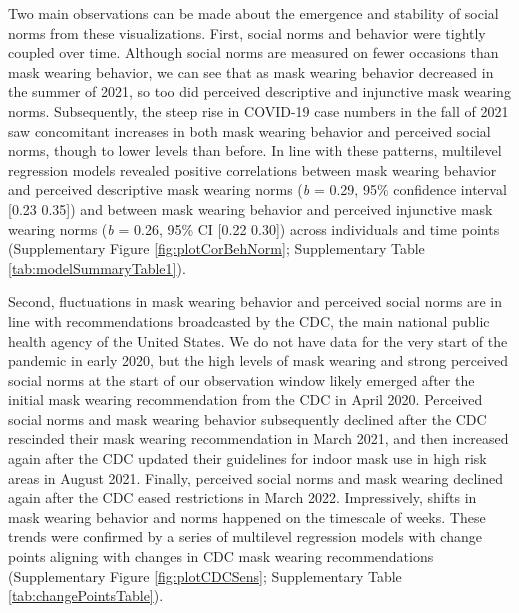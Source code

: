 \documentclass[
  man,floatsintext]{apa6}
\begin{document}
Two main observations can be made about the emergence and stability of social norms from these visualizations. First, social norms and behavior were tightly coupled over time. Although social norms are measured on fewer occasions than mask wearing behavior, we can see that as mask wearing behavior decreased in the summer of 2021, so too did perceived descriptive and injunctive mask wearing norms. Subsequently, the steep rise in COVID-19 case numbers in the fall of 2021 saw concomitant increases in both mask wearing behavior and perceived social norms, though to lower levels than before. In line with these patterns, multilevel regression models revealed positive correlations between mask wearing behavior and perceived descriptive mask wearing norms (\emph{b} = 0.29, 95\% confidence interval {[}0.23 0.35{]}) and between mask wearing behavior and perceived injunctive mask wearing norms (\emph{b} = 0.26, 95\% CI {[}0.22 0.30{]}) across individuals and time points (Supplementary Figure \ref{fig:plotCorBehNorm}; Supplementary Table \ref{tab:modelSummaryTable1}).

Second, fluctuations in mask wearing behavior and perceived social norms are in line with recommendations broadcasted by the CDC, the main national public health agency of the United States. We do not have data for the very start of the pandemic in early 2020, but the high levels of mask wearing and strong perceived social norms at the start of our observation window likely emerged after the initial mask wearing recommendation from the CDC in April 2020. Perceived social norms and mask wearing behavior subsequently declined after the CDC rescinded their mask wearing recommendation in March 2021, and then increased again after the CDC updated their guidelines for indoor mask use in high risk areas in August 2021. Finally, perceived social norms and mask wearing declined again after the CDC eased restrictions in March 2022. Impressively, shifts in mask wearing behavior and norms happened on the timescale of weeks. These trends were confirmed by a series of multilevel regression models with change points aligning with changes in CDC mask wearing recommendations (Supplementary Figure \ref{fig:plotCDCSens}; Supplementary Table \ref{tab:changePointsTable}).
\end{document}
